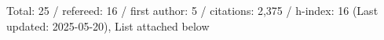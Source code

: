 Total: 25 / refereed: 16 / first author: 5 / citations: 2,375 / h-index: 16 (Last updated: 2025-05-20), List attached below